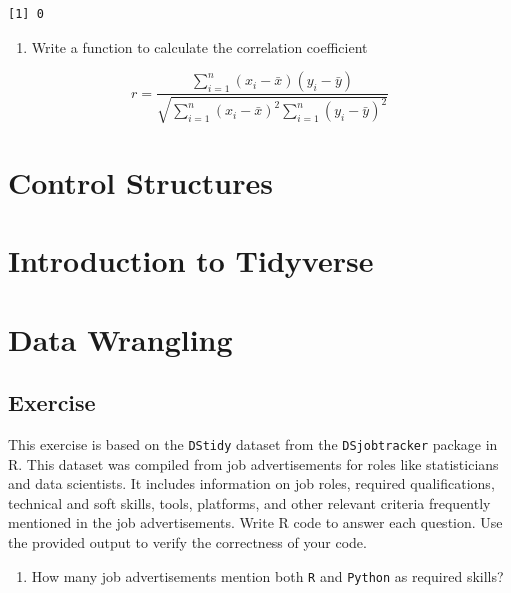 \documentclass[
  letterpaper,
  DIV=11,
  numbers=noendperiod]{scrreprt}
\providecommand{\tightlist}{%
  \setlength{\itemsep}{0pt}\setlength{\parskip}{0pt}}\usepackage{longtable,booktabs,array}
\begin{document}
\begin{verbatim}
[1] 0
\end{verbatim}

\begin{enumerate}
\def\labelenumi{\arabic{enumi}.}
\setcounter{enumi}{1}
\tightlist
\item
  Write a function to calculate the correlation coefficient
\end{enumerate}

\[r=\frac{\sum_{i=1}^{n}(x_i-\bar{x})(y_i-\bar{y})}{\sqrt{\sum_{i=1}^n(x_i-\bar{x})^2\sum_{i=1}^n(y_i-\bar{y})^2}}\]


\chapter{Control Structures}\label{control-structures}


\chapter{Introduction to Tidyverse}\label{introduction-to-tidyverse}


\chapter{Data Wrangling}\label{data-wrangling}

\section{Exercise}\label{exercise-9}

This exercise is based on the \texttt{DStidy} dataset from the
\texttt{DSjobtracker} package in R. This dataset was compiled from job
advertisements for roles like statisticians and data scientists. It
includes information on job roles, required qualifications, technical
and soft skills, tools, platforms, and other relevant criteria
frequently mentioned in the job advertisements. Write R code to answer
each question. Use the provided output to verify the correctness of your
code.

\begin{enumerate}
\def\labelenumi{\arabic{enumi}.}
\tightlist
\item
  How many job advertisements mention both \texttt{R} and
  \texttt{Python} as required skills?
\end{enumerate}
\end{document}
